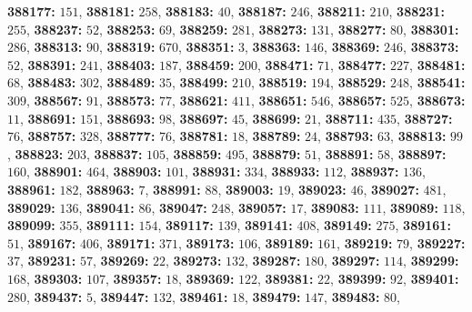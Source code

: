 \textsf{\bfseries 388177:} $151$, \textsf{\bfseries 388181:} $258$, \textsf{\bfseries 388183:} $40$, \textsf{\bfseries 388187:} $246$, \textsf{\bfseries 388211:} $210$, \textsf{\bfseries 388231:} $255$, \textsf{\bfseries 388237:} $52$, \textsf{\bfseries 388253:} $69$, \textsf{\bfseries 388259:} $281$, \textsf{\bfseries 388273:} $131$, \textsf{\bfseries 388277:} $80$, \textsf{\bfseries 388301:} $286$, \textsf{\bfseries 388313:} $90$, \textsf{\bfseries 388319:} $670$, \textsf{\bfseries 388351:} $3$, \textsf{\bfseries 388363:} $146$, \textsf{\bfseries 388369:} $246$, \textsf{\bfseries 388373:} $52$, \textsf{\bfseries 388391:} $241$, \textsf{\bfseries 388403:} $187$, \textsf{\bfseries 388459:} $200$, \textsf{\bfseries 388471:} $71$, \textsf{\bfseries 388477:} $227$, \textsf{\bfseries 388481:} $68$, \textsf{\bfseries 388483:} $302$, \textsf{\bfseries 388489:} $35$, \textsf{\bfseries 388499:} $210$, \textsf{\bfseries 388519:} $194$, \textsf{\bfseries 388529:} $248$, \textsf{\bfseries 388541:} $309$, \textsf{\bfseries 388567:} $91$, \textsf{\bfseries 388573:} $77$, \textsf{\bfseries 388621:} $411$, \textsf{\bfseries 388651:} $546$, \textsf{\bfseries 388657:} $525$, \textsf{\bfseries 388673:} $11$, \textsf{\bfseries 388691:} $151$, \textsf{\bfseries 388693:} $98$, \textsf{\bfseries 388697:} $45$, \textsf{\bfseries 388699:} $21$, \textsf{\bfseries 388711:} $435$, \textsf{\bfseries 388727:} $76$, \textsf{\bfseries 388757:} $328$, \textsf{\bfseries 388777:} $76$, \textsf{\bfseries 388781:} $18$, \textsf{\bfseries 388789:} $24$, \textsf{\bfseries 388793:} $63$, \textsf{\bfseries 388813:} $99$, \textsf{\bfseries 388823:} $203$, \textsf{\bfseries 388837:} $105$, \textsf{\bfseries 388859:} $495$, \textsf{\bfseries 388879:} $51$, \textsf{\bfseries 388891:} $58$, \textsf{\bfseries 388897:} $160$, \textsf{\bfseries 388901:} $464$, \textsf{\bfseries 388903:} $101$, \textsf{\bfseries 388931:} $334$, \textsf{\bfseries 388933:} $112$, \textsf{\bfseries 388937:} $136$, \textsf{\bfseries 388961:} $182$, \textsf{\bfseries 388963:} $7$, \textsf{\bfseries 388991:} $88$, \textsf{\bfseries 389003:} $19$, \textsf{\bfseries 389023:} $46$, \textsf{\bfseries 389027:} $481$, \textsf{\bfseries 389029:} $136$, \textsf{\bfseries 389041:} $86$, \textsf{\bfseries 389047:} $248$, \textsf{\bfseries 389057:} $17$, \textsf{\bfseries 389083:} $111$, \textsf{\bfseries 389089:} $118$, \textsf{\bfseries 389099:} $355$, \textsf{\bfseries 389111:} $154$, \textsf{\bfseries 389117:} $139$, \textsf{\bfseries 389141:} $408$, \textsf{\bfseries 389149:} $275$, \textsf{\bfseries 389161:} $51$, \textsf{\bfseries 389167:} $406$, \textsf{\bfseries 389171:} $371$, \textsf{\bfseries 389173:} $106$, \textsf{\bfseries 389189:} $161$, \textsf{\bfseries 389219:} $79$, \textsf{\bfseries 389227:} $37$, \textsf{\bfseries 389231:} $57$, \textsf{\bfseries 389269:} $22$, \textsf{\bfseries 389273:} $132$, \textsf{\bfseries 389287:} $180$, \textsf{\bfseries 389297:} $114$, \textsf{\bfseries 389299:} $168$, \textsf{\bfseries 389303:} $107$, \textsf{\bfseries 389357:} $18$, \textsf{\bfseries 389369:} $122$, \textsf{\bfseries 389381:} $22$, \textsf{\bfseries 389399:} $92$, \textsf{\bfseries 389401:} $280$, \textsf{\bfseries 389437:} $5$, \textsf{\bfseries 389447:} $132$, \textsf{\bfseries 389461:} $18$, \textsf{\bfseries 389479:} $147$, \textsf{\bfseries 389483:} $80$, 

